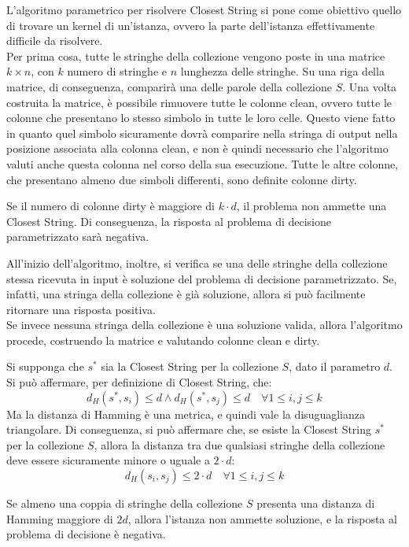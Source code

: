 L'algoritmo parametrico per risolvere Closest String si pone come obiettivo
quello di trovare un kernel di un'istanza, ovvero la parte dell'istanza
effettivamente difficile da risolvere.\\
Per prima cosa, tutte le stringhe della collezione vengono poste in una matrice
$k \times n$, con $k$ numero di stringhe e $n$ lunghezza delle stringhe.
Su una riga della matrice, di conseguenza, comparirà una delle parole della
collezione $S$.
Una volta costruita la matrice, è possibile rimuovere tutte le colonne clean,
ovvero tutte le colonne che presentano lo stesso simbolo in tutte le loro celle.
Questo viene fatto in quanto quel simbolo sicuramente dovrà comparire nella
stringa di output nella posizione associata alla colonna clean,
e non è quindi necessario che l'algoritmo valuti anche
questa colonna nel corso della sua esecuzione.
Tutte le altre colonne, che presentano almeno due simboli differenti,
sono definite colonne dirty.

\begin{thm}
    Se il numero di colonne dirty è maggiore di $k \cdot d$, il problema non
    ammette una Closest String. Di conseguenza, la risposta al problema
    di decisione parametrizzato sarà negativa.
\end{thm}

All'inizio dell'algoritmo, inoltre, si verifica se una delle stringhe
della collezione stessa ricevuta in input è soluzione del problema di
decisione parametrizzato.
Se, infatti, una stringa della collezione è già soluzione,
allora si può facilmente ritornare una risposta positiva.\\
Se invece nessuna
stringa della collezione è una soluzione valida, allora l'algoritmo procede,
costruendo la matrice e valutando colonne clean e dirty.

Si supponga che $s^*$ sia la Closest String per la collezione $S$, dato il
parametro $d$. Si può affermare, per definizione di Closest String, che:
\[
    d_H(s^*, s_i) \le d \land d_H(s^*, s_j) \le d
    \quad \forall 1 \le i, j \le k
\]
Ma la distanza di Hamming è una metrica, e quindi vale la disuguaglianza
triangolare. Di conseguenza, si può affermare che, se esiste
la Closest String $s^*$ per la collezione $S$, allora la distanza tra due
qualsiasi
stringhe della collezione deve essere sicuramente minore o uguale a
$2 \cdot d$:
\[
    d_H(s_i, s_j) \le 2 \cdot d \quad \forall 1 \le i, j \le k
\]
\begin{thm}
    Se almeno una coppia di stringhe della collezione $S$ presenta una distanza
    di Hamming maggiore di $2d$, allora l'istanza non ammette soluzione,
    e la risposta al problema di decisione è negativa.
\end{thm}


